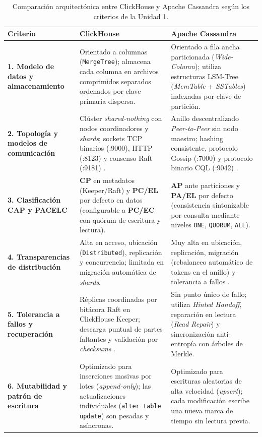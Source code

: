 \documentclass[12pt,a4paper]{article}
\begin{document}
\begin{table}[htbp]
\centering
\caption{Comparación arquitectónica entre ClickHouse y Apache Cassandra según los criterios de la Unidad 1.}
\label{tab:comparativa}
\small
\begin{tabular}{>{\raggedright\arraybackslash}p{3.0cm} >{\raggedright\arraybackslash}p{5.8cm} >{\raggedright\arraybackslash}p{5.8cm}}
\toprule
\textbf{Criterio} & \textbf{ClickHouse} & \textbf{Apache Cassandra} \\
\midrule
\textbf{1. Modelo de datos y almacenamiento} & Orientado a columnas (\texttt{MergeTree}); almacena cada columna en archivos comprimidos separados ordenados por clave primaria dispersa. & Orientado a fila ancha particionada (\textit{Wide-Column}); utiliza estructuras LSM-Tree (\textit{MemTable} + \textit{SSTables}) indexadas por clave de partición. \\
\midrule
\textbf{2. Topología y modelos de comunicación} & Clúster \textit{shared-nothing} con nodos coordinadores y \textit{shards}; sockets TCP binarios (:9000), HTTP (:8123) y consenso Raft (:9181) \cite{buzhin2023comparative, han2024palf}. & Anillo descentralizado \textit{Peer-to-Peer} sin nodo maestro; hashing consistente, protocolo Gossip (:7000) y protocolo binario CQL (:9042) \cite{vansteen2023distributed}. \\
\midrule
\textbf{3. Clasificación CAP y PACELC} & \textbf{CP} en metadatos (Keeper/Raft) y \textbf{PC/EL} por defecto en datos (configurable a \textbf{PC/EC} con quórum de escritura y lectura). & \textbf{AP} ante particiones y \textbf{PA/EL} por defecto (consistencia sintonizable por consulta mediante niveles \texttt{ONE}, \texttt{QUORUM}, \texttt{ALL}). \\
\midrule
\textbf{4. Transparencias de distribución} & Alta en acceso, ubicación (\texttt{Distributed}), replicación y concurrencia; limitada en migración automática de \textit{shards}. & Muy alta en ubicación, replicación, migración (rebalanceo automático de tokens en el anillo) y tolerancia a fallos \cite{vansteen2023distributed}. \\
\midrule
\textbf{5. Tolerancia a fallos y recuperación} & Réplicas coordinadas por bitácora Raft en ClickHouse Keeper; descarga puntual de partes faltantes y validación por \textit{checksums} \cite{han2024palf}. & Sin punto único de fallo; utiliza \textit{Hinted Handoff}, reparación en lectura (\textit{Read Repair}) y sincronización anti-entropía con árboles de Merkle. \\
\midrule
\textbf{6. Mutabilidad y patrón de escritura} & Optimizado para inserciones masivas por lotes (\textit{append-only}); las actualizaciones individuales (\texttt{alter table update}) son pesadas y asíncronas. & Optimizado para escrituras aleatorias de alta velocidad (\textit{upsert}); cada modificación escribe una nueva marca de tiempo sin lectura previa. \\

\end{tabular}
\end{table}
\end{document}
